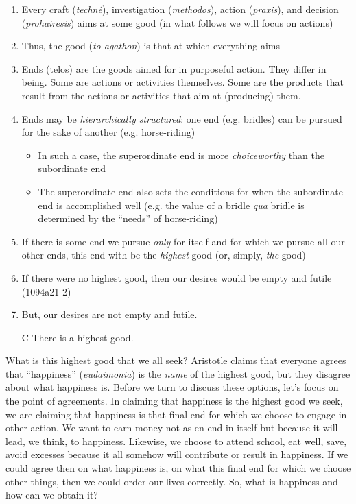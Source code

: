 \documentclass[oneside]{article}
\begin{document}
\begin{enumerate}
\item  Every craft (\emph{techn\^{e}}), investigation (\emph{methodos}), action (\emph{praxis}), and decision (\emph{prohairesis}) aims at some good (in what follows we will focus on actions)

\item Thus, the good (\emph{to agathon}) is that at which everything aims
\item  Ends (telos) are the goods aimed for in purposeful action. They differ in being. Some  are actions or activities themselves. Some are the products that result from the actions or activities that aim at (producing) them.

\item Ends may be \emph{hierarchically structured}: one end (e.g. bridles) can be pursued for the sake of another (e.g. horse-riding)
\begin{itemize}\item{In such a case, the superordinate end is more \emph{choiceworthy} than the subordinate end}\item{The superordinate end also sets the conditions for when the subordinate end is accomplished well (e.g. the value of a bridle \emph{qua} bridle is determined by the ``needs'' of horse-riding)}\end{itemize}

\item If there is some end we pursue \emph{only} for itself and for which we pursue all our other ends, this end with be the \emph{highest} good (or, simply, \emph{the} good) 

\item If there were no highest good, then our desires would be empty and futile (1094a21-2) 

\item But, our desires are not empty and futile. 
\item[C] There is a highest good. 
\end{enumerate}
What is this highest good that we all seek? Aristotle claims that everyone agrees that ``happiness'' (\emph{eudaimonia}) is the \emph{name} of the highest good, but they disagree about what happiness is. Before we turn to discuss these options, let's focus on the point of agreements. In claiming that happiness is the highest good we seek, we are claiming that happiness is that final end for which we choose to engage in other action. We want to earn money not as en end in itself but because it will lead, we think, to happiness. Likewise, we choose to attend school, eat well, save, avoid excesses because it all somehow will contribute or result in happiness. If we could agree then on what happiness is, on what this final end for which we choose other things, then we could order our lives correctly. So, what is happiness and how can we obtain it? 
\end{document}
